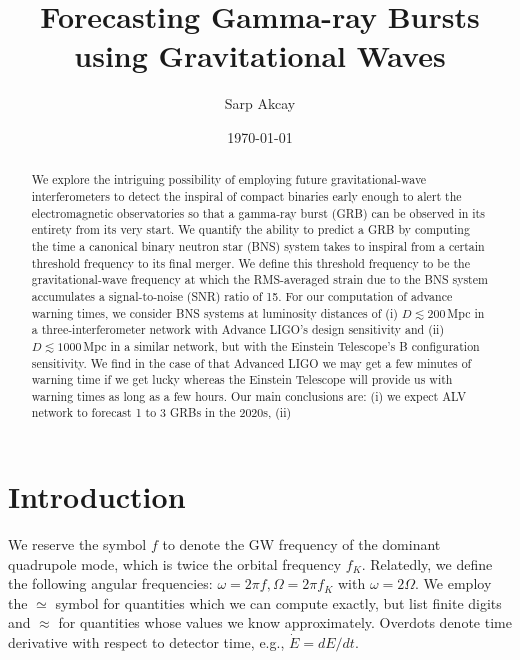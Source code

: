 \documentclass[amsmath,amssymb,aps,floats,amsfonts,notitlepage,superscriptaddress,eqsecnum,nofootinbib,10pt]{revtex4-1}
\begin{document}
\title{Forecasting Gamma-ray Bursts using Gravitational Waves}

\author{Sarp Akcay}

\date{\today}

\begin{abstract}
We explore the intriguing possibility of employing future gravitational-wave interferometers to detect the inspiral of compact binaries early enough to alert the electromagnetic observatories so that a gamma-ray burst (GRB) can be observed in its entirety from its very start.
We quantify the ability to predict a GRB by computing the time a canonical binary neutron star (BNS) system takes to inspiral from a certain threshold frequency to its final merger. We define this threshold frequency to be the gravitational-wave frequency at which the RMS-averaged strain due to the BNS system accumulates a signal-to-noise (SNR) ratio of 15. For our computation of advance warning times, we consider BNS systems at luminosity distances of (i) $D\lesssim200\,$Mpc in a three-interferometer network with Advance LIGO's design sensitivity and (ii) $D \lesssim 1000\,$Mpc in a similar network, but with the Einstein Telescope's B configuration
sensitivity. We find in the case of that Advanced LIGO we may get a few minutes of warning time if we get lucky whereas the Einstein Telescope will provide us
with warning times as long as a few hours.
Our main conclusions are: (i) we expect ALV network to forecast 1 to 3 GRBs in the 2020s, (ii)

\end{abstract}
\maketitle


\section{Introduction}\label{Sec:Intro}
We reserve the symbol $f$ to denote the GW frequency of the dominant quadrupole mode, which is twice the orbital frequency $f_K$. 
Relatedly, we define the following angular frequencies: $\omega = 2\pi f, \Omega=2\pi f_K$ with $\omega=2\Omega$.
We employ the $\simeq$ symbol for quantities which we can compute exactly, but list finite digits and $\approx$ for quantities whose values we know approximately.
Overdots denote time derivative with respect to detector time, e.g., $\dot{E} =dE/dt$.
\end{document}
